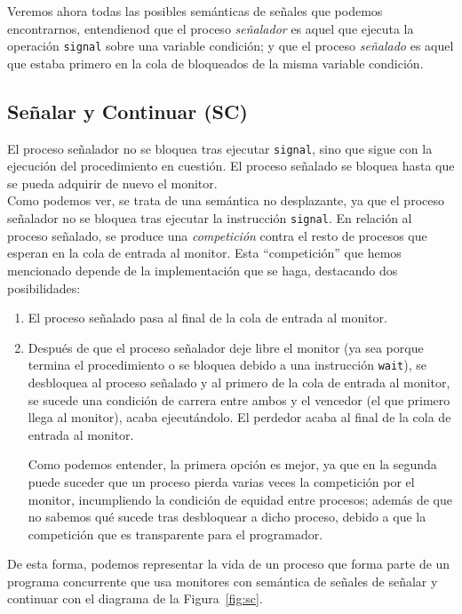 Veremos ahora todas las posibles semánticas de señales que podemos encontrarnos, entendienod que el proceso \textit{señalador} es aquel que ejecuta la operación \verb|signal| sobre una variable condición; y que el proceso \textit{señalado} es aquel que estaba primero en la cola de bloqueados de la misma variable condición.

\subsection{Señalar y Continuar (SC)}
El proceso señalador no se bloquea tras ejecutar \verb|signal|, sino que sigue con la ejecución del procedimiento en cuestión. El proceso señalado se bloquea hasta que se pueda adquirir de nuevo el monitor.\\

Como podemos ver, se trata de una semántica no desplazante, ya que el proceso señalador no se bloquea tras ejecutar la instrucción \verb|signal|. En relación al proceso señalado, se produce una \textit{competición} contra el resto de procesos que esperan en la cola de entrada al monitor. Esta ``competición'' que hemos mencionado depende de la implementación que se haga, destacando dos posibilidades:
\begin{enumerate}
    \item El proceso señalado pasa al final de la cola de entrada al monitor.
    \item Después de que el proceso señalador deje libre el monitor (ya sea porque termina el procedimiento o se bloquea debido a una instrucción \verb|wait|), se desbloquea al proceso señalado y al primero de la cola de entrada al monitor, se sucede una condición de carrera entre ambos y el vencedor (el que primero llega al monitor), acaba ejecutándolo. El perdedor acaba al final de la cola de entrada al monitor.

        Como podemos entender, la primera opción es mejor, ya que en la segunda puede suceder que un proceso pierda varias veces la competición por el monitor, incumpliendo la condición de equidad entre procesos; además de que no sabemos qué sucede tras desbloquear a dicho proceso, debido a que la competición que es transparente para el programador.
\end{enumerate}
De esta forma, podemos representar la vida de un proceso que forma parte de un programa concurrente que usa monitores con semántica de señales de señalar y continuar con el diagrama de la Figura~\ref{fig:sc}.

